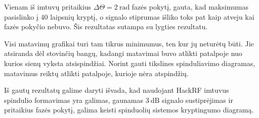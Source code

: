 \documentclass[main.tex]{subfiles}
\begin{document}
Vienam iš imtuvų pritaikius $\Delta \Theta = 2\ \mathrm{rad}$ fazės pokytį, gauta, kad
maksimumas pasislinko į 40 laipsnių kryptį, o signalo stiprumas išliko toks pat kaip atveju
kai fazės pokyčio
nebuvo. Šis rezultatas sutampa su  lygties rezultatu.

Visi matavimų grafikai turi tam tikrus minimumus, ten kur jų neturėtų būti. Jie atsiranda
dėl stovinčių bangų, kadangi matavimai buvo atlikti patalpoje nuo kurios sienų vyksta
atsispindžiai. Norint gauti tikslines spinduliavimo diagramas, matavimus reiktų
atlikti patalpoje, kurioje nėra atspindžių.

Iš gautų rezultatų galime daryti išvada, kad naudojant HackRF imtuvus spindulio formavimas
yra galimas, gaunamas $3\ \mathrm{dB}$ signalo sustiprėjimas ir pritaikius fazės pokytį,
galima keisti spinduolių sistemos kryptingumo diagramą.
\end{document}
